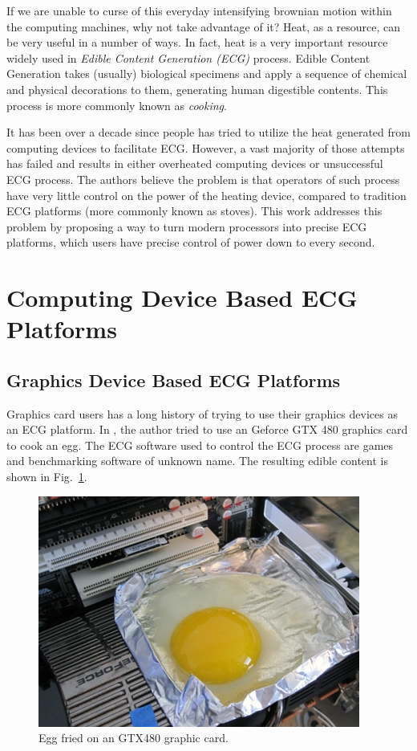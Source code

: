 \documentclass[conference]{IEEEtran}
\begin{document}
If we are unable to curse of this everyday intensifying brownian motion within the computing
machines, why not take advantage of it? Heat, as a resource, can be very useful in a number of ways.
In fact, heat is a very important resource widely used in \textit{Edible Content Generation (ECG)} process. 
Edible Content Generation takes (usually) biological specimens and apply a sequence of chemical and physical
decorations to them, generating human digestible contents. This process is more commonly known as \textit{cooking}.

It has been over a decade since people has tried to utilize the heat generated from computing
devices to facilitate ECG. However, a vast majority of those attempts has failed and results in
either overheated computing devices or unsuccessful ECG process. The authors believe the problem is
that operators of such process have very little control on the power of the heating device, compared to
tradition ECG platforms (more commonly known as stoves). This work addresses this problem by proposing
a way to turn modern processors into precise ECG platforms, which users have precise control of power down
to every second.

\section{Computing Device Based ECG Platforms}

\subsection{Graphics Device Based ECG Platforms}

Graphics card users has a long history of trying to use their graphics devices as an ECG platform. 
In \cite{jegxegg}, the author tried to use an Geforce GTX 480 graphics card to cook an egg. The ECG software used
to control the ECG process are games and benchmarking software of unknown name. The resulting edible content is shown in Fig.~\ref{gtx480egg}.

\begin{figure}[htbp]
\centerline{\includegraphics[scale=.4]{fig/gtx480egg.jpg}}
\caption{Egg fried on an GTX480 graphic card.}
\label{gtx480egg}
\end{figure}
\end{document}
